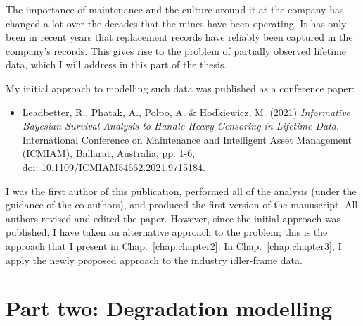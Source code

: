\documentclass[apa,colorlinks,emptypage]{curtinThesis}
\begin{document}
The importance of maintenance and the culture around it at the company has changed a lot over the decades that the mines have been operating. It has only been in recent years that replacement records have reliably been captured in the company's records. This gives rise to the problem of partially observed lifetime data, which I will address in this part of the thesis.

My initial approach to modelling such data was published as a conference paper:
\begin{itemize}
  \item Leadbetter, R., Phatak, A., Polpo, A. \& Hodkiewicz, M. (2021) \textit{Informative Bayesian Survival Analysis to Handle Heavy Censoring in Lifetime Data}, International Conference on Maintenance and Intelligent Asset Management (ICMIAM), Ballarat, Australia, pp. 1-6,\\ doi: 10.1109/ICMIAM54662.2021.9715184.
\end{itemize}
I was the first author of this publication, performed all of the analysis (under the guidance of the co-authors), and produced the first version of the manuscript. All authors revised and edited the paper. However, since the initial approach was published, I have taken an alternative approach to the problem; this is the approach that I present in Chap.~\ref{chap:chapter2}. In Chap.~\ref{chap:chapter3}, I apply the newly proposed approach to the industry idler-frame data.




\part{Part two: Degradation modelling}\label{part:two}
\end{document}
